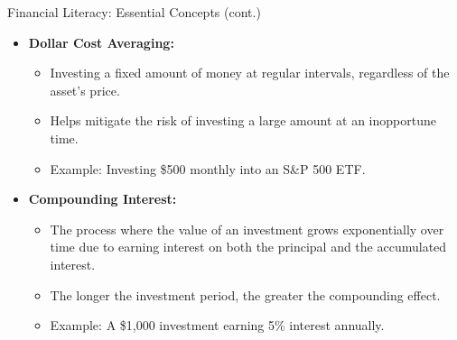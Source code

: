 \documentclass{beamer}
\begin{document}
\begin{frame}{Financial Literacy: Essential Concepts (cont.)}
        \begin{itemize}
            \item \textbf{Dollar Cost Averaging:}
            \begin{itemize}
                \item Investing a fixed amount of money at regular intervals, regardless of the asset's price.
                \item Helps mitigate the risk of investing a large amount at an inopportune time.
                \item Example: Investing \$500 monthly into an S&P 500 ETF.
            \end{itemize}
            \item \textbf{Compounding Interest:}
            \begin{itemize}
                \item The process where the value of an investment grows exponentially over time due to earning interest on both the principal and the accumulated interest.
                \item The longer the investment period, the greater the compounding effect.
                \item Example: A \$1,000 investment earning 5\% interest annually.
            \end{itemize}
        \end{itemize}
\end{frame}
\end{document}
